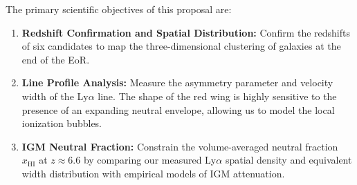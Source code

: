 The primary scientific objectives of this proposal are:
\begin{enumerate}
    \item \textbf{Redshift Confirmation and Spatial Distribution:} Confirm the redshifts of six candidates to map the three-dimensional clustering of galaxies at the end of the EoR.
    \item \textbf{Line Profile Analysis:} Measure the asymmetry parameter and velocity width of the Ly$\alpha$ line. The shape of the red wing is highly sensitive to the presence of an expanding neutral envelope, allowing us to model the local ionization bubbles.
    \item \textbf{IGM Neutral Fraction:} Constrain the volume-averaged neutral fraction $x_{\text{HI}}$ at $z \approx 6.6$ by comparing our measured Ly$\alpha$ spatial density and equivalent width distribution with empirical models of IGM attenuation.
\end{enumerate}
